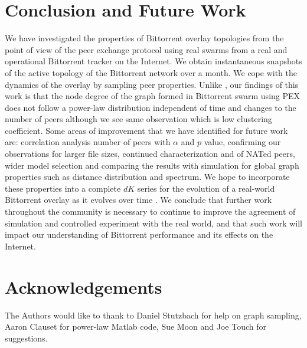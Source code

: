 \documentclass[10pt,conference,letterpaper]{IEEEtran}
\begin{document}
\section{Conclusion and Future Work}\label{conclude}
We have investigated the properties of Bittorrent overlay topologies from the point of view of the peer exchange protocol using real swarms from a real and operational Bittorrent tracker on the Internet. 
We obtain instantaneous snapshots of the active topology of the Bittorrent network over a month.
We cope with the dynamics of the overlay by sampling peer properties. 
Unlike \cite{dale2008evolution}, our findings of this work is that the node degree of the graph formed in Bittorrent swarm using PEX does not follow a power-law distribution independent of time and changes to the number of peers although we see same observation which is low clustering coefficient.
Some areas of improvement that we have identified for future work are: correlation analysis number of peers with $\alpha$ and $p$ value, confirming our observations for larger file sizes, continued characterization and of NATed peers, wider model selection and comparing the results with simulation for global graph properties such as distance distribution and spectrum.
We hope to incorporate these properties into a complete $dK$ series for the evolution of a real-world Bittorrent overlay as it evolves over time \cite{mahadevan2006systematic}. 
We conclude that further work throughout the community is necessary to continue to improve the agreement of simulation and controlled experiment with the real world, and that such work will impact our understanding of Bittorrent performance and its effects on the Internet.


\section*{Acknowledgements}
The Authors would like to thank to Daniel Stutzbach for help on graph sampling, Aaron Clauset for power-law Matlab code, Sue Moon and Joe Touch for suggestions.



\end{document}
